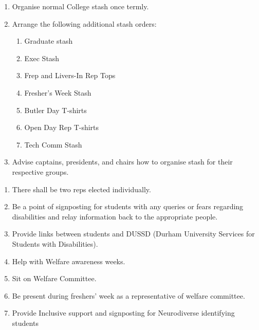 \begin{enumerate}
    \item Organise normal College stash once termly.
    \item Arrange the following additional stash orders:
    \begin{enumerate}
        \item Graduate stash
        \item Exec Stash 
        \item Frep and Livers-In Rep Tops 
        \item Fresher’s Week Stash 
        \item Butler Day T-shirts 
        \item Open Day Rep T-shirts 
        \item Tech Comm Stash
    \end{enumerate}
    \item Advise captains, presidents, and chairs how to organise stash for their respective groups.
    
\end{enumerate}

\begin{enumerate}
    \item There shall be two reps elected individually. 
    \item Be a point of signposting for students with any queries or fears regarding disabilities and relay information back to the appropriate people.
    \item Provide links between students and DUSSD (Durham University Services for Students with Disabilities).
    \item Help with Welfare awareness weeks.
    \item Sit on Welfare Committee.
    \item Be present during freshers’ week as a representative of welfare committee.
    \item Provide Inclusive support and signposting for Neurodiverse identifying students
    
    
\end{enumerate}

